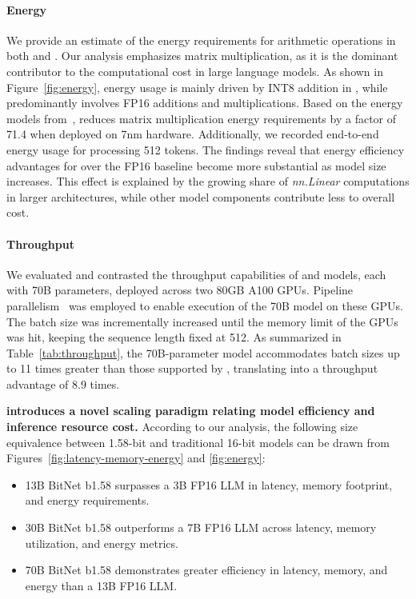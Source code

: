 \paragraph{Energy}

We provide an estimate of the energy requirements for arithmetic operations in both  and . Our analysis emphasizes matrix multiplication, as it is the dominant contributor to the computational cost in large language models. As shown in Figure~\ref{fig:energy}, energy usage is mainly driven by INT8 addition in , while  predominantly involves FP16 additions and multiplications. Based on the energy models from~\cite{energycost, pokebnn},  reduces matrix multiplication energy requirements by a factor of 71.4 when deployed on 7nm hardware. Additionally, we recorded end-to-end energy usage for processing 512 tokens. The findings reveal that energy efficiency advantages for  over the FP16  baseline become more substantial as model size increases. This effect is explained by the growing share of \emph{nn.Linear} computations in larger architectures, while other model components contribute less to overall cost.

\paragraph{Throughput}

We evaluated and contrasted the throughput capabilities of  and  models, each with 70B parameters, deployed across two 80GB A100 GPUs. Pipeline parallelism~\cite{gpipe} was employed to enable execution of the  70B model on these GPUs. The batch size was incrementally increased until the memory limit of the GPUs was hit, keeping the sequence length fixed at 512. As summarized in Table~\ref{tab:throughput}, the 70B-parameter  model accommodates batch sizes up to 11 times greater than those supported by , translating into a throughput advantage of 8.9 times.

\textbf{ introduces a novel scaling paradigm relating model efficiency and inference resource cost.} According to our analysis, the following size equivalence between 1.58-bit and traditional 16-bit models can be drawn from Figures~\ref{fig:latency-memory-energy} and \ref{fig:energy}:

\begin{itemize}
    \item 13B BitNet b1.58 surpasses a 3B FP16 LLM in latency, memory footprint, and energy requirements.
    \item 30B BitNet b1.58 outperforms a 7B FP16 LLM across latency, memory utilization, and energy metrics.
    \item 70B BitNet b1.58 demonstrates greater efficiency in latency, memory, and energy than a 13B FP16 LLM.
\end{itemize}

